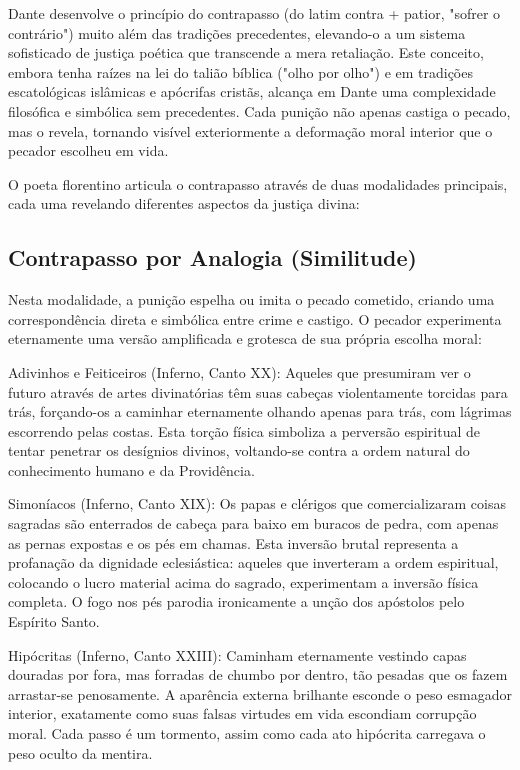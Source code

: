Dante desenvolve o princípio do contrapasso (do latim contra + patior, "sofrer o contrário") muito além das tradições precedentes, elevando-o a um sistema sofisticado de justiça poética que transcende a mera retaliação. Este conceito, embora tenha raízes na lei do talião bíblica ("olho por olho") e em tradições escatológicas islâmicas e apócrifas cristãs, alcança em Dante uma complexidade filosófica e simbólica sem precedentes. Cada punição não apenas castiga o pecado, mas o revela, tornando visível exteriormente a deformação moral interior que o pecador escolheu em vida.

O poeta florentino articula o contrapasso através de duas modalidades principais, cada uma revelando diferentes aspectos da justiça divina:

\subsection{Contrapasso por Analogia (Similitude)}

Nesta modalidade, a punição espelha ou imita o pecado cometido, criando uma correspondência direta e simbólica entre crime e castigo. O pecador experimenta eternamente uma versão amplificada e grotesca de sua própria escolha moral:

Adivinhos e Feiticeiros (Inferno, Canto XX): Aqueles que presumiram ver o futuro através de artes divinatórias têm suas cabeças violentamente torcidas para trás, forçando-os a caminhar eternamente olhando apenas para trás, com lágrimas escorrendo pelas costas. Esta torção física simboliza a perversão espiritual de tentar penetrar os desígnios divinos, voltando-se contra a ordem natural do conhecimento humano e da Providência.

Simoníacos (Inferno, Canto XIX): Os papas e clérigos que comercializaram coisas sagradas são enterrados de cabeça para baixo em buracos de pedra, com apenas as pernas expostas e os pés em chamas. Esta inversão brutal representa a profanação da dignidade eclesiástica: aqueles que inverteram a ordem espiritual, colocando o lucro material acima do sagrado, experimentam a inversão física completa. O fogo nos pés parodia ironicamente a unção dos apóstolos pelo Espírito Santo.

Hipócritas (Inferno, Canto XXIII): Caminham eternamente vestindo capas douradas por fora, mas forradas de chumbo por dentro, tão pesadas que os fazem arrastar-se penosamente. A aparência externa brilhante esconde o peso esmagador interior, exatamente como suas falsas virtudes em vida escondiam corrupção moral. Cada passo é um tormento, assim como cada ato hipócrita carregava o peso oculto da mentira.

